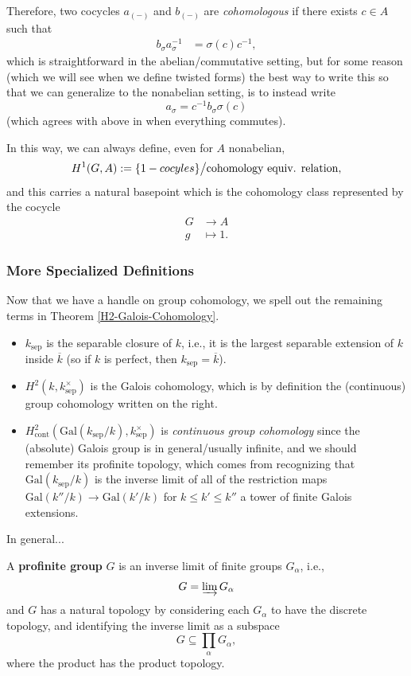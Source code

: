 \documentclass[12pt]{article}
\newcommand{\sep}{\text{sep}}
\newcommand{\Gal}{\mathrm{Gal}}
\begin{document}
Therefore, two cocycles $a_{(-)}$ and $b_{(-)}$ are \textit{cohomologous} if there exists $c\in A$ such that
\begin{align*}
    b_{\sigma}a_{\sigma}^{-1} &= \sigma(c)c^{-1},
\end{align*}
which is straightforward in the abelian/commutative setting, but for some reason (which we will see when we define twisted forms) the best way to write this so that we can generalize to the nonabelian setting, is to instead write
\[a_\sigma = c^{-1} b_\sigma \sigma(c)\]
(which agrees with above in when everything commutes).

In this way, we can always define, even for $A$ nonabelian,
\[H^1(G,A) := \{1-cocyles\}\big/ \text{cohomology equiv. relation},\]
and this carries a natural basepoint which is the cohomology class represented by the cocycle
\begin{align*}
    G&\to A\\
    g &\mapsto 1.
\end{align*}

\subsubsection{More Specialized Definitions}

Now that we have a handle on group cohomology, we spell out the remaining terms in Theorem \ref{H2-Galois-Cohomology}.

\begin{itemize}
    \item $k_\sep$ is the separable closure of $k$, i.e., it is the largest separable extension of $k$ inside $\overline{k}$ (so if $k$ is perfect, then $k_\sep=\overline{k}$).
    \item $H^2(k,k_\sep^\times)$ is the Galois cohomology, which is by definition the (continuous) group cohomology written on the right.
    \item $H^2_{\text{cont}}(\Gal(k_{\sep}/k),k_{\sep}^\times)$ is \textit{continuous group cohomology} since the (absolute) Galois group is in general/usually infinite, and we should remember its profinite topology, which comes from recognizing that $\Gal(k_\sep/k)$ is the inverse limit of all of the restriction maps $\Gal(k''/k) \to \Gal(k'/k)$ for $k\leq k' \leq k''$ a tower of finite Galois extensions.
\end{itemize}

In general...

\begin{defn}
    A \textbf{profinite group} $G$ is an inverse limit of finite groups $G_\alpha$, i.e.,
    \[G = \varinjlim G_\alpha\]
    and $G$ has a natural topology by considering each $G_\alpha$ to have the discrete topology, and identifying the inverse limit as a subspace
    \[G \subseteq \prod_\alpha G_\alpha,\]
    where the product has the product topology.
\end{defn}
\end{document}
